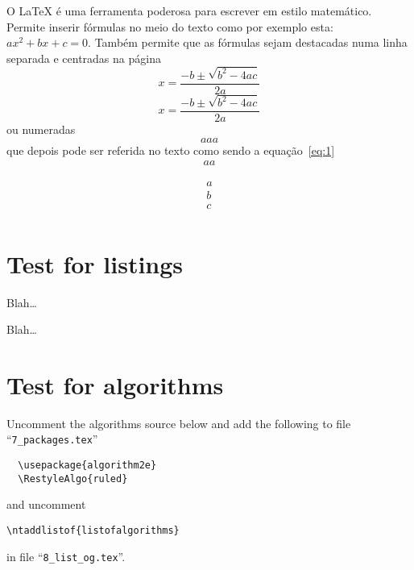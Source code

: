 O LaTeX é uma ferramenta poderosa para escrever em estilo matemático. Permite inserir fórmulas no meio do texto como por exemplo esta: $ax^2 + bx + c = 0$. Também permite que as fórmulas sejam destacadas numa linha separada e centradas na página 
$$x = \frac{-b \pm \sqrt{b^2-4ac}}{2a}$$
\[x = \frac{-b \pm \sqrt{b^2-4ac}}{2a}\]
ou numeradas 
\begin{equation}
aaa
\label{eq:1}
\end{equation}
que depois pode ser referida no texto como sendo a equação~\ref{eq:1}
$$\begin{array}{l}
aa
\end{array}
$$

\begin{eqnarray}
a\\
b\\
c\\
\end{eqnarray}

\section{Test for listings} %
\label{sec:test_for_listings}

Blah…



Blah…

\section{Test for algorithms}
\label{sec:test_for_algorithms}

Uncomment the algorithms source below and add the following to file “\verb!7_packages.tex!”
\begin{verbatim}
  \usepackage{algorithm2e}
  \RestyleAlgo{ruled}
\end{verbatim}
and uncomment
\begin{verbatim}
\ntaddlistof{listofalgorithms}
\end{verbatim}
in file “\verb!8_list_og.tex!”.




